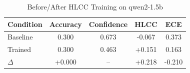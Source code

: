 \begin{table}[h]
\centering
\caption{Before/After HLCC Training on qwen2-1.5b}
\begin{tabular}{lcccc}
\toprule
Condition & Accuracy & Confidence & HLCC & ECE \\
\midrule
Baseline & 0.300 & 0.673 & -0.067 & 0.373 \\
Trained & 0.300 & 0.463 & +0.151 & 0.163 \\
\midrule
$\Delta$ & +0.000 & -- & +0.218 & -0.210 \\
\bottomrule
\end{tabular}
\label{tab:training_qwen2-1.5b}
\end{table}
